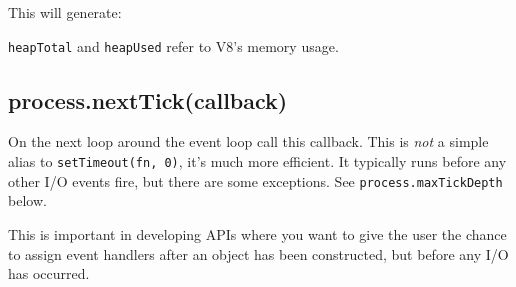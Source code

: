 This will generate:

\begin{Shaded}
\begin{Highlighting}[]
\NormalTok{\{ }\NormalTok{: }\NormalTok{,}
  \NormalTok{: }\NormalTok{,}
  \NormalTok{: } \NormalTok{\}}
\end{Highlighting}
\end{Shaded}

\texttt{heapTotal} and \texttt{heapUsed} refer to V8's memory usage.

\subsection{process.nextTick(callback)}

On the next loop around the event loop call this callback. This is
\emph{not} a simple alias to \texttt{setTimeout(fn, 0)}, it's much more
efficient. It typically runs before any other I/O events fire, but there
are some exceptions. See \texttt{process.maxTickDepth} below.

\begin{Shaded}
\begin{Highlighting}[]
\NormalTok{(}\NormalTok{() \{}
  \NormalTok{(}\NormalTok{);}
\NormalTok{\});}
\end{Highlighting}
\end{Shaded}

This is important in developing APIs where you want to give the user the
chance to assign event handlers after an object has been constructed,
but before any I/O has occurred.

\begin{Shaded}
\begin{Highlighting}[]
 

  \NormalTok{(}\NormalTok{() \{}
    \NormalTok{();}
  \NormalTok{(}\NormalTok{));}
\NormalTok{\}}

  
\NormalTok{();}

\end{Highlighting}
\end{Shaded}

